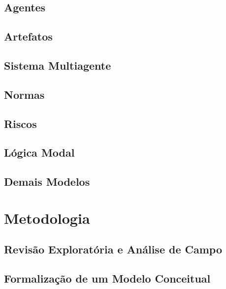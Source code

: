 \documentclass[openright]{normas-utf-tex} %
\begin{document}
	\section{Agentes} \label{agent}
		
	\section{Artefatos} \label{artefact}
		
	\section{Sistema Multiagente} \label{sma}
		
	\section{Normas} \label{normasdastani}
		
	\section{Riscos} \label{risksec}
		
	\section{Lógica Modal} \label{logic}
		
	\section{Demais Modelos}
		
		 		
				
		
	
\chapter{Metodologia}
\label{chap:metod}
	
    \section{Revisão Exploratória e Análise de Campo}\label{revexpanalcamp} 
          
    \section{Formalização de um Modelo Conceitual}\label{modconceitual}
        
\end{document}
